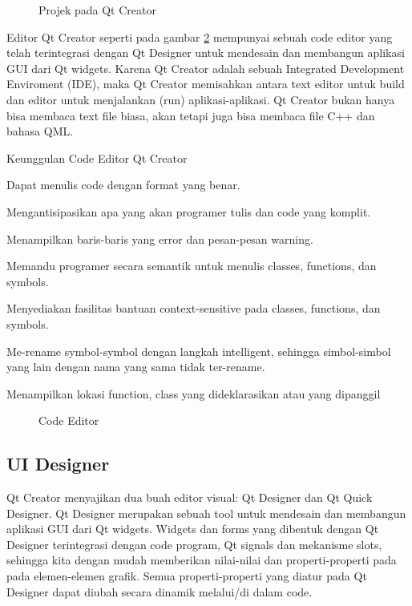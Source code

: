 \begin{figure}[htbp]
\centering 
{}
\caption{Projek pada Qt Creator}
\label{fig:projek-pada-qt-creator}
\end{figure}

Editor Qt Creator seperti pada gambar \ref{fig:code-editor}
 mempunyai sebuah code editor yang telah terintegrasi
dengan Qt Designer untuk mendesain dan membangun aplikasi GUI dari 
Qt widgets. Karena Qt Creator adalah sebuah 
Integrated Development Enviroment (IDE), maka Qt Creator memisahkan 
antara text editor untuk build dan editor untuk menjalankan (run) 
aplikasi-aplikasi. Qt Creator bukan hanya bisa membaca text file biasa, 
akan tetapi juga bisa membaca file C++ dan bahasa QML.

Keunggulan Code Editor Qt Creator

\begin{dinglist}{52}

\item
  Dapat menulis code dengan format yang benar.
\item
  Mengantisipasikan apa yang akan programer tulis dan code yang komplit.
\item
  Menampilkan baris-baris yang error dan pesan-pesan warning.
\item
  Memandu programer secara semantik untuk menulis classes, functions,
  dan symbols.
\item
  Menyediakan fasilitas bantuan context-sensitive pada classes,
  functions, dan symbols.
\item
  Me-rename symbol-symbol dengan langkah intelligent, sehingga
  simbol-simbol yang lain dengan nama yang sama tidak ter-rename.
\item
  Menampilkan lokasi function, class yang dideklarasikan atau yang
  dipanggil
\end{dinglist}

\begin{figure}[htbp]
\centering
{}
\label{fig:code-editor}
\caption{ Code Editor}
\end{figure}

\subsection{UI Designer}\label{ui-designer}

Qt Creator menyajikan dua buah editor visual: 
Qt Designer  dan Qt Quick
Designer. Qt Designer merupakan sebuah tool untuk mendesain dan
membangun aplikasi GUI dari Qt widgets. Widgets dan forms yang dibentuk
dengan Qt Designer terintegrasi dengan code program, Qt signals dan
mekanisme slots, sehingga kita dengan mudah memberikan nilai-nilai dan
properti-properti pada pada elemen-elemen grafik. Semua
properti-properti yang diatur pada Qt Designer dapat diubah secara
dinamik melalui/di dalam code.

